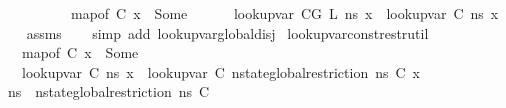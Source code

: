 \begin{isabellebody}
\ \ \ \ \ \ \ \ \ \ {\isachardoublequoteopen}map{\isacharunderscore}{\kern0pt}of\ C\ x\ {\isacharequal}{\kern0pt}\ Some\ {\isasymtau}{\isachardoublequoteclose}\isanewline
\ \ \ \ \ {\isachardoublequoteopen}lookup{\isacharunderscore}{\kern0pt}var\ {\isacharparenleft}{\kern0pt}C{\isacharat}{\kern0pt}G{\isacharcomma}{\kern0pt}\ L{\isacharparenright}{\kern0pt}\ ns\ x\ {\isacharequal}{\kern0pt}\ lookup{\isacharunderscore}{\kern0pt}var\ {\isacharparenleft}{\kern0pt}C{\isacharcomma}{\kern0pt}{\isacharbrackleft}{\kern0pt}{\isacharbrackright}{\kern0pt}{\isacharparenright}{\kern0pt}\ ns\ x{\isachardoublequoteclose}\isanewline
%
\isadelimproof
\ \ %
\endisadelimproof
%
\isatagproof
{}\isamarkupfalse%
\ assms\isanewline
\ \ \isamarkupfalse%
\ {\isacharparenleft}{\kern0pt}simp\ add{\isacharcolon}{\kern0pt}\ lookup{\isacharunderscore}{\kern0pt}var{\isacharunderscore}{\kern0pt}global{\isacharunderscore}{\kern0pt}disj{\isacharparenright}{\kern0pt}%
\endisatagproof
{\isafoldproof}%
%
\isadelimproof
\isanewline
%
\endisadelimproof
\isanewline
{}\isamarkupfalse%
\ lookup{\isacharunderscore}{\kern0pt}var{\isacharunderscore}{\kern0pt}const{\isacharunderscore}{\kern0pt}restr{\isacharunderscore}{\kern0pt}util{\isacharunderscore}{\kern0pt}{}{\isacharcolon}{\kern0pt}\isanewline
\ \ \ {\isachardoublequoteopen}map{\isacharunderscore}{\kern0pt}of\ C\ x\ {\isacharequal}{\kern0pt}\ Some\ {\isasymtau}{\isachardoublequoteclose}\isanewline
\ \ \ {\isachardoublequoteopen}lookup{\isacharunderscore}{\kern0pt}var\ {\isacharparenleft}{\kern0pt}C{\isacharcomma}{\kern0pt}{\isacharbrackleft}{\kern0pt}{\isacharbrackright}{\kern0pt}{\isacharparenright}{\kern0pt}\ ns\ x\ {\isacharequal}{\kern0pt}\ lookup{\isacharunderscore}{\kern0pt}var\ {\isacharparenleft}{\kern0pt}C{\isacharcomma}{\kern0pt}{\isacharbrackleft}{\kern0pt}{\isacharbrackright}{\kern0pt}{\isacharparenright}{\kern0pt}\ {\isacharparenleft}{\kern0pt}nstate{\isacharunderscore}{\kern0pt}global{\isacharunderscore}{\kern0pt}restriction\ ns\ C{\isacharparenright}{\kern0pt}\ x{\isachardoublequoteclose}\isanewline
%
\isadelimproof
%
\endisadelimproof
%
\isatagproof
{}\isamarkupfalse%
\ {\isacharminus}{\kern0pt}\isanewline
\ \ \isamarkupfalse%
\ {\isacharquery}{\kern0pt}ns{\isacharprime}{\kern0pt}\ {\isacharequal}{\kern0pt}\ {\isachardoublequoteopen}nstate{\isacharunderscore}{\kern0pt}global{\isacharunderscore}{\kern0pt}restriction\ ns\ C{\isachardoublequoteclose}\isanewline
\ \ \isamarkupfalse%

\end{isabellebody}
